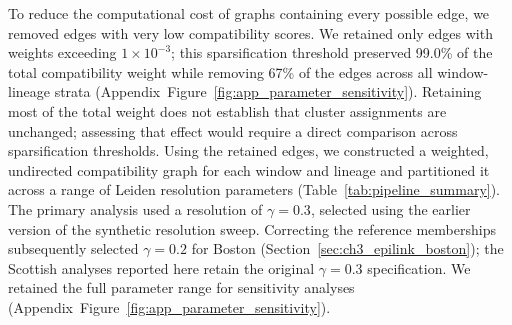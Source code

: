 To reduce the computational cost of graphs containing every possible edge, we removed edges with very low compatibility scores. We retained only edges with weights exceeding $1\times10^{-3}$; this sparsification threshold preserved 99.0\% of the total compatibility weight while removing 67\% of the edges across all window-lineage strata (Appendix~Figure~\ref{fig:app_parameter_sensitivity}). Retaining most of the total weight does not establish that cluster assignments are unchanged; assessing that effect would require a direct comparison across sparsification thresholds. Using the retained edges, we constructed a weighted, undirected compatibility graph for each window and lineage and partitioned it across a range of Leiden resolution parameters (Table~\ref{tab:pipeline_summary}). The primary analysis used a resolution of $\gamma = 0.3$, selected using the earlier version of the synthetic resolution sweep. Correcting the reference memberships subsequently selected $\gamma = 0.2$ for Boston (Section~\ref{sec:ch3_epilink_boston}); the Scottish analyses reported here retain the original $\gamma = 0.3$ specification. We retained the full parameter range for sensitivity analyses (Appendix~Figure~\ref{fig:app_parameter_sensitivity}).

